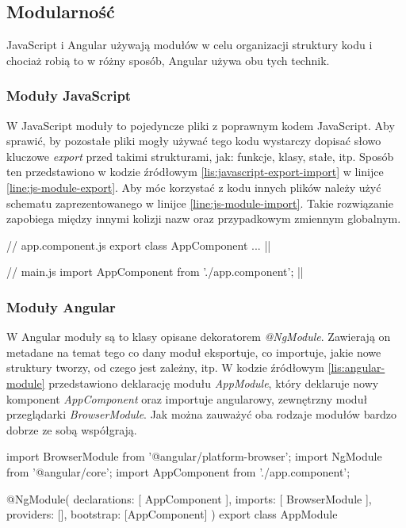 	\subsection{Modularność}
	JavaScript i Angular używają modułów w celu organizacji struktury kodu i chociaż robią to w różny sposób, Angular używa obu tych technik.
	
	\subsubsection*{Moduły JavaScript}
	W JavaScript moduły to pojedyncze pliki z poprawnym kodem JavaScript. Aby sprawić, by pozostałe pliki mogły używać tego kodu wystarczy dopisać słowo kluczowe \textit{export} przed takimi strukturami, jak: funkcje, klasy, stałe, itp. Sposób ten przedstawiono w kodzie źródłowym \ref{lis:javascript-export-import} w linijce \ref{line:js-module-export}. Aby móc korzystać z kodu innych plików należy użyć schematu zaprezentowanego w linijce \ref{line:js-module-import}. Takie rozwiązanie zapobiega między innymi kolizji nazw oraz przypadkowym zmiennym globalnym.
	
	\begin{code}[
		language=javascript,
		caption={Stosowanie modułów JavaScript (źródło: \cite{javascript-module})},
		label={lis:javascript-export-import},
		escapechar=|
	]
// app.component.js
export class AppComponent { ... } |\label{line:js-module-export}|

// main.js
import { AppComponent } from './app.component'; |\label{line:js-module-import}|
	\end{code}	
	
	\subsubsection*{Moduły Angular}
	W Angular moduły są to klasy opisane dekoratorem \textit{@NgModule}. Zawierają on metadane na temat tego co dany moduł eksportuje, co importuje, jakie nowe struktury tworzy, od czego jest zależny, itp. W kodzie źródłowym \ref{lis:angular-module} przedstawiono deklarację modułu \textit{AppModule}, który deklaruje nowy komponent \textit{AppComponent} oraz importuje angularowy, zewnętrzny moduł przeglądarki \textit{BrowserModule}. Jak można zauważyć oba rodzaje modułów bardzo dobrze ze sobą współgrają.
	
	\begin{code}[
		language=javascript,
		caption={Stosowanie modułów Angular (źródło: \cite{javascript-module})},
		label={lis:angular-module},
		escapechar=|
	]
import { BrowserModule } from '@angular/platform-browser';
import { NgModule } from '@angular/core';
import { AppComponent } from './app.component';

@NgModule({
  declarations: [
    AppComponent
  ],
  imports: [
    BrowserModule
  ],
  providers: [],
  bootstrap: [AppComponent]
})
export class AppModule { }
	\end{code}\\
	
